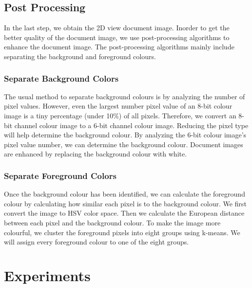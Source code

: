\documentclass[10pt, conference, compsocconf]{IEEEtran}
\begin{document}
\subsection{Post Processing}

\label{post-process}

In the last step, we obtain the 2D view document image. Inorder to get the better quality of the document image, we use post-processing algorithms to enhance the document image. The post-processing algorithms mainly include separating the background and foreground colours.

\subsubsection{Separate Background Colors}

The usual method to separate background colours is by analyzing the number of pixel values.
However, even the largest number pixel value of an 8-bit colour image is a tiny percentage (under 10\%) of all pixels.
Therefore, we convert an 8-bit channel colour image to a 6-bit channel colour image.
Reducing the pixel type will help determine the background colour.
By analyzing the 6-bit colour image's pixel value number, we can determine the background colour. Document images are enhanced by replacing the background colour with white.

\subsubsection{Separate Foreground Colors}

\label{separate-foreground-colors}
Once the background colour has been identified, we can calculate the foreground colour by calculating how similar each pixel is to the background colour.
We first convert the image to HSV color space.
Then we calculate the European distance between each pixel and the background colour.
To make the image more colourful, we cluster the foreground pixels into eight groups using k-means\cite{hartigan1979algorithm}. 
We will assign every foreground colour to one of the eight groups. 


\section{Experiments}
\end{document}
